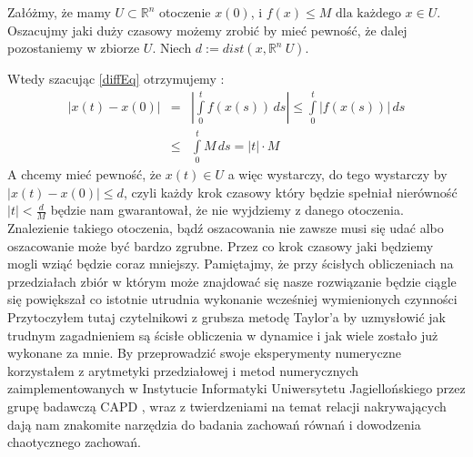 Załóżmy, że mamy $ U \subset \mathbb R^n $ otoczenie $ x(0) $, i $ f(x) \leq M \text{ dla każdego } x \in U $. 
Oszacujmy jaki duży czasowy możemy zrobić by mieć pewność, że dalej pozostaniemy w zbiorze $ U $. 
Niech $ d := dist(x, \mathbb R^n \ U ) $.

Wtedy szacując \ref{diffEq} otrzymujemy :
\begin{eqnarray*}
  | x(t) - x(0) | & = &|\int\limits^t_0 f(x(s)) \,ds | \leq \int\limits^t_0 |f(x(s))| \,ds \\
		  & \leq & \int\limits^t_0 M \,ds = |t| \cdot M
\end{eqnarray*}
A chcemy mieć pewność, że $ x(t) \in U $ a więc wystarczy, do tego wystarczy by $ | x(t) - x(0) | \leq d $, czyli
każdy krok czasowy który będzie spełniał nierówność $ |t| < \frac{d}{M} $ będzie nam gwarantował, że nie wyjdziemy 
z danego otoczenia.
Znalezienie takiego otoczenia, bądź oszacowania nie zawsze musi się udać albo oszacowanie może być bardzo zgrubne. Przez 
co krok czasowy jaki będziemy mogli wziąć będzie coraz mniejszy. Pamiętajmy, że przy ścisłych obliczeniach na przedziałach
zbiór w którym może znajdować się nasze rozwiązanie będzie ciągle się powiększał co istotnie utrudnia wykonanie wcześniej wymienionych 
czynności
\newline
Przytoczyłem tutaj czytelnikowi z grubsza metodę Taylor'a by uzmysłowić jak trudnym zagadnieniem są ścisłe obliczenia w dynamice
i jak wiele zostało już wykonane za mnie. By przeprowadzić swoje eksperymenty numeryczne korzystałem z arytmetyki 
przedziałowej i metod numerycznych zaimplementowanych w Instytucie Informatyki Uniwersytetu Jagiellońskiego przez 
grupę badawczą CAPD \cite{CAPD}, wraz z twierdzeniami na temat relacji nakrywających dają nam znakomite narzędzia do 
badania zachowań równań i dowodzenia chaotycznego zachowań.

 


